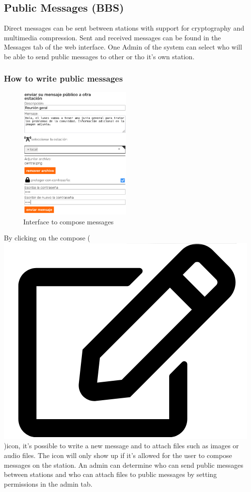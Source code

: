 \documentclass[11pt,a4paper]{article}
\begin{document}
\subsection{Public Messages  (BBS)}

Direct messages can be sent between stations with support for cryptography and multimedia compression. Sent and received messages can be found in the Messages tab of the web interface. One Admin of the system can select who will be able to send public messages to other or tho it's own station.

\subsubsection{How to write public messages}


\begin{figure}[H]
    \centering
    \includegraphics[width=0.5\textwidth]{screenshots/frontend/es/publicas.png}
    \caption{Interface to compose messages}
    \label{fig:compose}
\end{figure}

By clicking on the compose (\includegraphics[height=0.8\baselineskip]{pictures/edit.png})icon, it's possible to write a new message and to attach files such as images or audio files. The icon will only show up if it's allowed for the user to compose messages on the station. An admin can determine who can send public messages between stations and who can attach files to public messages by setting permissions in the admin tab. 
\end{document}
